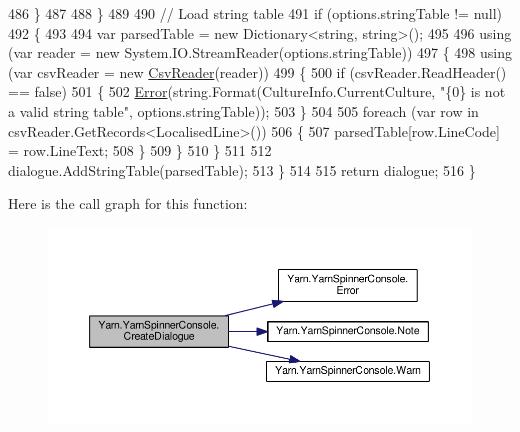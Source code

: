\begin{DoxyCode}
486                 \}
487 
488             \}
489 
490             \textcolor{comment}{// Load string table}
491             \textcolor{keywordflow}{if} (options.stringTable != null)
492             \{
493 
494                 var parsedTable = \textcolor{keyword}{new} Dictionary<string, string>();
495 
496                 \textcolor{keyword}{using} (var reader = \textcolor{keyword}{new} System.IO.StreamReader(options.stringTable))
497                 \{
498                     \textcolor{keyword}{using} (var csvReader = \textcolor{keyword}{new} \hyperlink{a00079}{CsvReader}(reader))
499                     \{
500                         \textcolor{keywordflow}{if} (csvReader.ReadHeader() == \textcolor{keyword}{false})
501                         \{
502                             \hyperlink{a00197_a2f63f9f5b7634cb50ee75ff2eb18b137}{Error}(\textcolor{keywordtype}{string}.Format(CultureInfo.CurrentCulture, \textcolor{stringliteral}{"\{0\} is not a valid string
       table"}, options.stringTable));
503                         \}
504 
505                         \textcolor{keywordflow}{foreach} (var row \textcolor{keywordflow}{in} csvReader.GetRecords<LocalisedLine>())
506                         \{
507                             parsedTable[row.LineCode] = row.LineText;
508                         \}
509                     \}
510                 \}
511 
512                 dialogue.AddStringTable(parsedTable);
513             \}
514 
515             \textcolor{keywordflow}{return} dialogue;
516         \}
\end{DoxyCode}


Here is the call graph for this function\-:
\nopagebreak
\begin{figure}[H]
\begin{center}
\leavevmode
\includegraphics[width=350pt]{a00197_aab244361a510cee18ad2f636d110e0d5_cgraph}
\end{center}
\end{figure}




